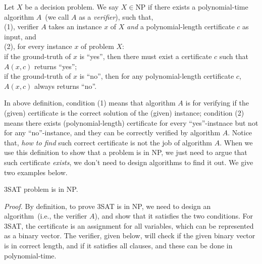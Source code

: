 \begin{definition}[NP]
Let $X$ be a decision problem. We say $X\in \textrm{NP}$ if there exists a polynomial-time algorithm $A$~(we call $A$ as a \emph{verifier}), such that,\\
	(1), verifier $A$ takes an instance $x$ of $X$ \emph{and} a polynomial-length certificate $c$ as input, and \\
	(2), for every instance $x$ of problem $X$: \\
	\hspace*{0.2cm} if the ground-truth of $x$ is ``yes'', then there must exist a certificate $c$ such that $A(x,c)$ returns ``yes'';\\
	\hspace*{0.2cm} if the ground-truth of $x$ is ``no'', then for any polynomial-length certificate $c$, $A(x,c)$ always returns ``no''.
\end{definition}

In above definition, condition (1) means that algorithm $A$ is for verifying if the (given) certificate is the correct solution of the (given) instance;
condition (2) means there exists (polynomial-length) certificate
for every ``yes''-instnace but not for any ``no''-instance, and they can be correctly verified by algorithm $A$.
Notice that, \emph{how to find} such correct certificate is not the job of algorithm $A$.
When we use this definition to show that a problem is in NP, we just need to argue that
such certificate \emph{exists}, we don't need to design algorithms to find it out.
We give two examples below.

\begin{fact}
3SAT problem is in NP.
\end{fact}
\emph{Proof.} By definition, to prove 3SAT is in NP, we need to design an
algorithm~(i.e., the verifier $A$), and show that it satisfies the two
conditions. For 3SAT, the certificate is an assignment for all variables,
which can be represented as a binary vector. The verifier, given below, will check
if the given binary vector is in correct length, and if it satisfies all clauses,
and these can be done in polynomial-time.

\begin{minipage}{0.8\textwidth}
	\xxx
	\xxx
	\xxx
	\xxx
	\xxx
\end{minipage}

